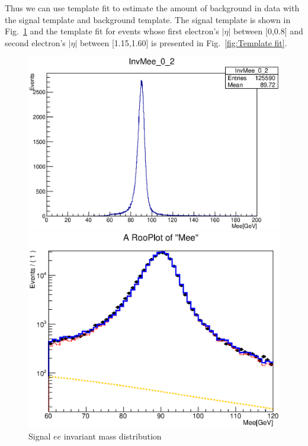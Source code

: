 Thus we can use template fit to estimate the amount of background in
data with the signal template and background template. The signal
template is shown in Fig.~\ref{fig:Signal} and the template fit for
events whose first electron's $|\eta|$ between [0,0.8] and second
electron's $|\eta|$ between [1.15,1.60] is presented in
Fig.~\ref{fig:Template fit}.
\begin{figure}[htp]
  \begin{minipage}[t]{0.5\linewidth}
  \centering
  \includegraphics[width=\columnwidth]{figures/ChargeMisID/MergeEt_Ntot_Zee02.eps}
  \caption{Signal $ee$ invariant mass distribution}
  \label{fig:Signal}
  \end{minipage}
  \begin{minipage}[t]{0.5\linewidth}
  \centering
  \includegraphics[width=\columnwidth]{figures/ChargeMisID/Tot_Template_0_2.eps}

\end{minipage}
\end{figure}
